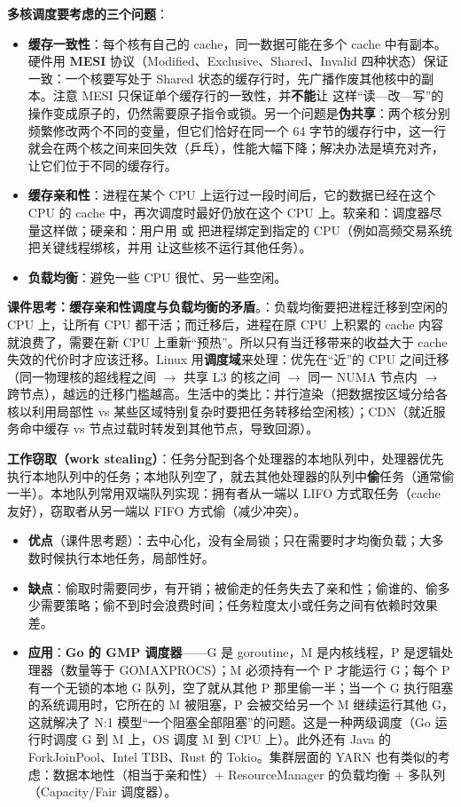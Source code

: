 \textbf{多核调度要考虑的三个问题}：
\begin{itemize}
    \item \textbf{缓存一致性}：每个核有自己的 cache，同一数据可能在多个 cache 中有副本。硬件用 \textbf{MESI} 协议（Modified、Exclusive、Shared、Invalid 四种状态）保证一致：一个核要写处于 Shared 状态的缓存行时，先广播作废其他核中的副本。注意 MESI 只保证单个缓存行的一致性，并\textbf{不能}让  这样“读—改—写”的操作变成原子的，仍然需要原子指令或锁。另一个问题是\textbf{伪共享}：两个核分别频繁修改两个不同的变量，但它们恰好在同一个 64 字节的缓存行中，这一行就会在两个核之间来回失效（乒乓），性能大幅下降；解决办法是填充对齐，让它们位于不同的缓存行。
    \item \textbf{缓存亲和性}：进程在某个 CPU 上运行过一段时间后，它的数据已经在这个 CPU 的 cache 中，再次调度时最好仍放在这个 CPU 上。软亲和：调度器尽量这样做；硬亲和：用户用  或  把进程绑定到指定的 CPU（例如高频交易系统把关键线程绑核，并用  让这些核不运行其他任务）。
    \item \textbf{负载均衡}：避免一些 CPU 很忙、另一些空闲。
\end{itemize}
\textbf{课件思考：缓存亲和性调度与负载均衡的矛盾}。：负载均衡要把进程迁移到空闲的 CPU 上，让所有 CPU 都干活；而迁移后，进程在原 CPU 上积累的 cache 内容就浪费了，需要在新 CPU 上重新“预热”。所以只有当迁移带来的收益大于 cache 失效的代价时才应该迁移。Linux 用\textbf{调度域}来处理：优先在“近”的 CPU 之间迁移（同一物理核的超线程之间 $\to$ 共享 L3 的核之间 $\to$ 同一 NUMA 节点内 $\to$ 跨节点），越远的迁移门槛越高。生活中的类比：并行渲染（把数据按区域分给各核以利用局部性 vs 某些区域特别复杂时要把任务转移给空闲核）；CDN（就近服务命中缓存 vs 节点过载时转发到其他节点，导致回源）。

\textbf{工作窃取（work stealing）}：任务分配到各个处理器的本地队列中，处理器优先执行本地队列中的任务；本地队列空了，就去其他处理器的队列中\textbf{偷}任务（通常偷一半）。本地队列常用双端队列实现：拥有者从一端以 LIFO 方式取任务（cache 友好），窃取者从另一端以 FIFO 方式偷（减少冲突）。
\begin{itemize}
    \item \textbf{优点}（课件思考题）：去中心化，没有全局锁；只在需要时才均衡负载；大多数时候执行本地任务，局部性好。
    \item \textbf{缺点}：偷取时需要同步，有开销；被偷走的任务失去了亲和性；偷谁的、偷多少需要策略；偷不到时会浪费时间；任务粒度太小或任务之间有依赖时效果差。
    \item \textbf{应用}：\textbf{Go 的 GMP 调度器}——G 是 goroutine，M 是内核线程，P 是逻辑处理器（数量等于 GOMAXPROCS）；M 必须持有一个 P 才能运行 G；每个 P 有一个无锁的本地 G 队列，空了就从其他 P 那里偷一半；当一个 G 执行阻塞的系统调用时，它所在的 M 被阻塞，P 会被交给另一个 M 继续运行其他 G，这就解决了 N:1 模型“一个阻塞全部阻塞”的问题。这是一种两级调度（Go 运行时调度 G 到 M 上，OS 调度 M 到 CPU 上）。此外还有 Java 的 ForkJoinPool、Intel TBB、Rust 的 Tokio。集群层面的 YARN 也有类似的考虑：数据本地性（相当于亲和性）+ ResourceManager 的负载均衡 + 多队列（Capacity/Fair 调度器）。
\end{itemize}

